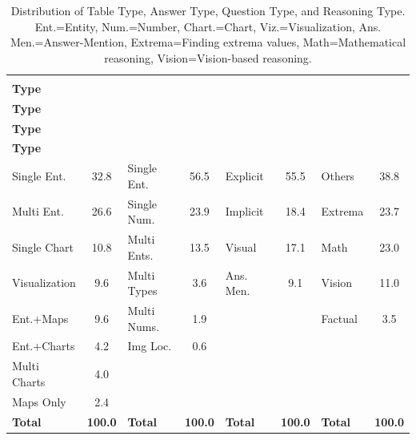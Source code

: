 \documentclass[11pt]{article}
\begin{document}
\begin{table}[H]
\vspace{-0.8em}
\centering
\scriptsize

\setlength{\aboverulesep}{2pt}
\setlength{\belowrulesep}{2pt}
\setlength{\tabcolsep}{1pt}
\renewcommand{\arraystretch}{1.25}

\begin{tabular}{l c|l c|l c|l c}

\toprule
\shortstack{\textbf{Table}\\\textbf{Type}} & \shortstack{\textbf{\%}} &
\shortstack{\textbf{Answer}\\\textbf{Type}} & \shortstack{\textbf{\%}} &
\shortstack{\textbf{Question}\\\textbf{Type}} & \shortstack{\textbf{\%}} &
\shortstack{\textbf{Reasoning}\\\textbf{Type}} & \shortstack{\textbf{\%}} \\
\midrule

Single Ent.     & 32.8 & Single Ent.   & 56.5 & Explicit   & 55.5 & Others   & 38.8 \\
Multi Ent.      & 26.6 & Single Num.   & 23.9 & Implicit   & 18.4 & Extrema  & 23.7 \\
Single Chart    & 10.8 & Multi Ents.   & 13.5 & Visual     & 17.1 & Math     & 23.0 \\
Visualization   & 9.6  & Multi Types   & 3.6  & Ans. Men.     & 9.1  & Vision   & 11.0 \\
Ent.+Maps       & 9.6  & Multi Nums.   & 1.9  &            &      & Factual  & 3.5 \\
Ent.+Charts     & 4.2  & Img Loc.      & 0.6  &            &      &          &      \\
Multi Charts    & 4.0  &               &      &            &      &          &      \\
Maps Only       & 2.4  &               &      &            &      &          &      \\
\midrule

\textbf{Total} & \textbf{100.0} &
\textbf{Total} & \textbf{100.0} &
\textbf{Total} & \textbf{100.0} &
\textbf{Total} & \textbf{100.0} \\
\bottomrule

\end{tabular}

\vspace{-0.6em}
\caption{\small Distribution of Table Type, Answer Type, Question Type, and Reasoning Type. Ent.=Entity, Num.=Number, Chart.=Chart, Viz.=Visualization, Ans. Men.=Answer-Mention, Extrema=Finding extrema values, Math=Mathematical reasoning, Vision=Vision-based reasoning.}
\label{tab:combined_types}
\vspace{-1.0em}
\end{table}
\end{document}
